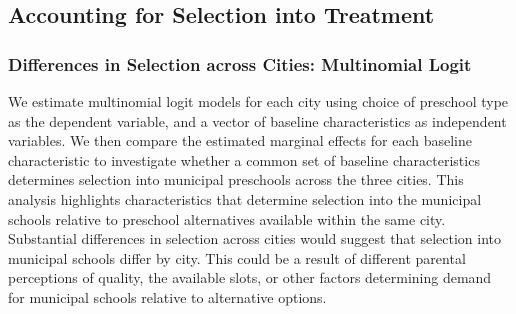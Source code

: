 %
%

\subsection{Accounting for Selection into Treatment} \label{subsection:selection}

\subsubsection{Differences in Selection across Cities: Multinomial Logit}
We estimate multinomial logit models for each city using choice of preschool type as the dependent variable, and a vector of baseline characteristics as independent variables. We then compare the estimated marginal effects for each baseline characteristic to investigate whether a common set of baseline characteristics determines selection into municipal preschools across the three cities. This analysis highlights characteristics that determine selection into the municipal schools relative to preschool alternatives available within the same city. Substantial differences in selection across cities would suggest that selection into municipal schools differ by city. This could be a result of different parental perceptions of quality, the available slots, or other factors determining demand for municipal schools relative to alternative options. 

